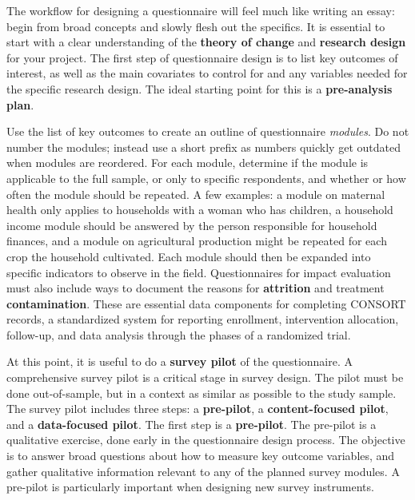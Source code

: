 The workflow for designing a questionnaire will feel much like writing an essay:
begin from broad concepts and slowly flesh out the specifics.
It is essential to start with a clear understanding of the
\textbf{theory of change}
and \textbf{research design}
  for your project.
The first step of questionnaire design is to list key outcomes of interest,
as well as the main covariates to control for and any variables needed for the specific research design.
The ideal starting point for this is a \textbf{pre-analysis plan}.

Use the list of key outcomes to create an outline of questionnaire \textit{modules}.
Do not number the modules; instead use a short prefix
as numbers quickly get outdated when modules are reordered.
For each module, determine if the module is applicable to the full sample,
or only to specific respondents,
and whether or how often the module should be repeated.
A few examples:
a module on maternal health only applies
to households with a woman who has children,
a household income module should be answered
by the person responsible for household finances,
and a module on agricultural production
might be repeated for each crop the household cultivated.
Each module should then be expanded
into specific indicators to observe in the field.
Questionnaires for impact evaluation
must also include ways to document the reasons for \textbf{attrition} and
treatment \textbf{contamination}.
These are essential data components for completing CONSORT records,
a standardized system for reporting enrollment, intervention allocation, follow-up,
and data analysis through the phases of a randomized trial.\cite{begg1996improving}


At this point, it is useful to do a \textbf{survey pilot}
of the questionnaire.
A comprehensive survey pilot is a critical stage in survey design.
The pilot must be done out-of-sample,
but in a context as similar as possible to the study sample.
The survey pilot includes three steps:
a \textbf{pre-pilot}, a \textbf{content-focused pilot}, and a \textbf{data-focused pilot}.
The first step is a \textbf{pre-pilot}.
The pre-pilot is a qualitative exercise, done early in the questionnaire design process.
The objective is to answer broad questions about how to measure key outcome variables,
and gather qualitative information relevant to any of the planned survey modules.
A pre-pilot is particularly important when designing new survey instruments.

